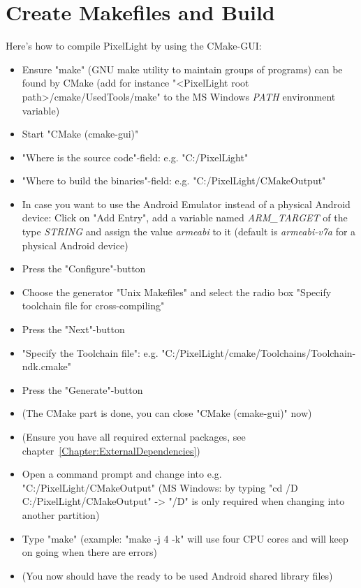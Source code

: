 \section{Create Makefiles and Build}
\label{Android:CreateMakefilesAndBuild}
Here's how to compile PixelLight by using the CMake-\ac{GUI}:
\begin{itemize}
\item{Ensure "make" (GNU make utility to maintain groups of programs) can be found by CMake (add for instance "\textless PixelLight root path\textgreater /cmake/UsedTools/make" to the MS Windows \emph{PATH} environment variable)}
\item{Start "CMake (cmake-gui)"}
\item{"Where is the source code"-field: e.g. "C:/PixelLight"}
\item{"Where to build the binaries"-field: e.g. "C:/PixelLight/CMakeOutput"}
\item{In case you want to use the Android Emulator instead of a physical Android device: Click on "Add Entry", add a variable named \emph{ARM\_TARGET} of the type \emph{STRING} and assign the value \emph{armeabi} to it (default is \emph{armeabi-v7a} for a physical Android device)}
\item{Press the "Configure"-button}
\item{Choose the generator "Unix Makefiles" and select the radio box "Specify toolchain file for cross-compiling"}
\item{Press the "Next"-button}
\item{"Specify the Toolchain file": e.g. "C:/PixelLight/cmake/Toolchains/Toolchain-ndk.cmake"}
\item{Press the "Generate"-button}
\item{(The CMake part is done, you can close "CMake (cmake-gui)" now)}
\item{(Ensure you have all required external packages, see chapter~\ref{Chapter:ExternalDependencies})}
\item{Open a command prompt and change into e.g. "C:/PixelLight/CMakeOutput" (MS Windows: by typing "cd /D C:/PixelLight/CMakeOutput" -> "/D" is only required when changing into another partition)}
\item{Type "make" (example: "make -j 4 -k" will use four \ac{CPU} cores and will keep on going when there are errors)}
\item{(You now should have the ready to be used Android shared library files)}
\end{itemize}




